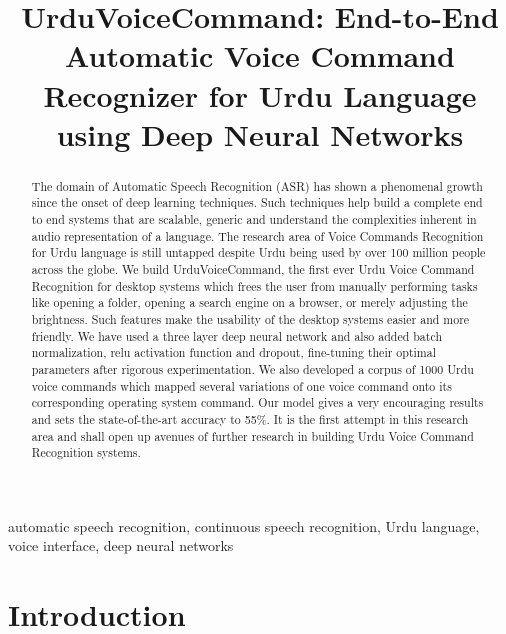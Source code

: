 \documentclass[conference]{IEEEtran}
\begin{document}
\title{UrduVoiceCommand: End-to-End Automatic Voice Command Recognizer for Urdu Language using Deep Neural Networks}

\author{
}

\maketitle

\begin{abstract}
The domain of Automatic Speech Recognition (ASR) has shown a phenomenal growth since the onset of deep learning techniques. Such techniques help build a complete end to end systems that are scalable, generic and understand the complexities inherent in audio representation of a language. The research area of Voice Commands Recognition for Urdu language is still untapped despite Urdu being used by over 100 million people across the globe. We build UrduVoiceCommand, the first ever Urdu Voice Command Recognition for desktop systems which frees the user from manually performing tasks like opening a folder, opening a search engine on a browser, or merely adjusting the brightness. Such features make the usability of the desktop systems easier and more friendly. We have used a three layer deep neural network and also added batch normalization, relu activation function and dropout, fine-tuning their optimal parameters after rigorous experimentation. We also developed a corpus of 1000 Urdu voice commands which mapped several variations of one voice command onto its corresponding operating system command. Our model gives a very encouraging results and sets the state-of-the-art accuracy to 55\%. It is the first attempt in this research area and shall open up avenues of further research in building Urdu Voice Command Recognition systems.
\end{abstract}

\begin{IEEEkeywords}
automatic speech recognition, continuous speech recognition, Urdu language, voice interface, deep neural networks
\end{IEEEkeywords}

\section{Introduction} \label{introduction}
\end{document}
